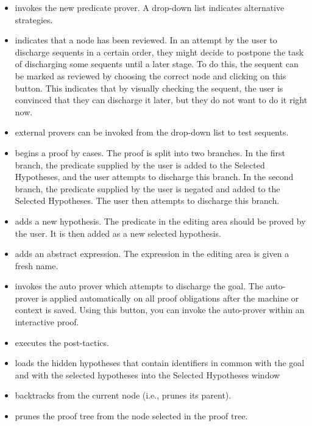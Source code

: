 \begin{itemize}
    \item {} invokes the new predicate prover. A drop-down list indicates alternative strategies.
    \item {} indicates that a node has been reviewed. In an attempt by the user to discharge sequents in a certain order, they might decide to postpone the task of discharging some sequents until a later stage. To do this, the sequent can be marked as reviewed by choosing the correct node and clicking on this button. This indicates that by visually checking the sequent, the user is convinced that they can discharge it later, but they do not want to do it right now.
    \item {} external provers can be invoked from the drop-down list to test sequents.
    \item {} begins a proof by cases. The proof is split into two branches. In the first branch, the predicate supplied by the user is added to the \textsf{Selected Hypotheses}, and the user attempts to discharge this branch. In the second branch, the predicate supplied by the user is negated and added to the \textsf{Selected Hypotheses}. The user then attempts to discharge this branch. 
    \item {} adds a new hypothesis. The predicate in the editing area should be proved by the user. It is then added as a new selected hypothesis.
    \item {} adds an abstract expression. The expression in the editing area is given a fresh name.
    \item {} invokes the auto prover which attempts to discharge the goal. The auto-prover is applied automatically on all proof obligations after the machine or context is saved. Using this button, you can invoke the auto-prover within an interactive proof.
    \item {} executes the post-tactics.
    \item {} loads the hidden hypotheses that contain identifiers in common with the goal and with the selected hypotheses into the Selected Hypotheses window 
    \item {} backtracks from the current node (i.e., prunes its parent).
    \item {} prunes the proof tree from the node selected in the proof tree.

\end{itemize}
